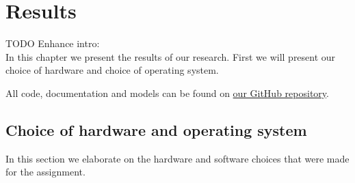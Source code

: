 \documentclass[12pt]{scrreprt}
\begin{document}
\chapter{Results}
TODO Enhance intro:\\
In this chapter we present the results of our research. First we will present our choice of hardware and choice of operating system.
\par
All code, documentation and models can be found on \href{https://github.com/Yousousen/safety-module-for-care-robot-rose.git}{our GitHub repository}.

\section{Choice of hardware and operating system}
\label{Choice of hardware and software}
In this section we elaborate on the hardware and software choices that were made for the assignment.
\end{document}
